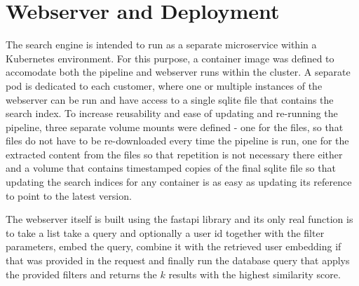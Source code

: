 \documentclass[draft,final]{vutinfth} %
\begin{document}
\section{Webserver and Deployment}
The search engine is intended to run as a separate microservice within a Kubernetes environment. For this purpose, a container image was defined to accomodate both the pipeline and webserver runs within the cluster. A separate pod is dedicated to each customer, where one or multiple instances of the webserver can be run and have access to a single sqlite file that contains the search index. To increase reusability and ease of updating and re-running the pipeline, three separate volume mounts were defined - one for the files, so that files do not have to be re-downloaded every time the pipeline is run, one for the extracted content from the files so that repetition is not necessary there either and a volume that contains timestamped copies of the final sqlite file so that updating the search indices for any container is as easy as updating its reference to point to the latest version.

The webserver itself is built using the fastapi library and its only real function is to take a list take a query and optionally a user id together with the filter parameters, embed the query, combine it with the retrieved user embedding if that was provided in the request and finally run the database query that applys the provided filters and returns the $k$ results with the highest similarity score. 


\end{document}

